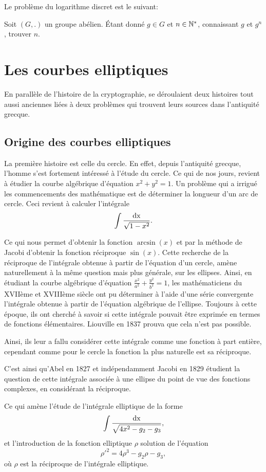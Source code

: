 Le problème du logarithme discret est le suivant: 

Soit $(G,.)$ un groupe abélien. Étant donné $g \in G$ et $n \in \mathbb{N}^*$, connaissant $g$ et
$g^{n}$, trouver $n$.

\section{Les courbes elliptiques}

En parallèle de l'histoire de la cryptographie, se déroulaient deux histoires tout aussi
anciennes liées à deux problèmes qui trouvent leurs sources dans l'antiquité grecque.

\subsection{Origine des courbes elliptiques}
La première histoire est celle du cercle. En effet, depuis l'antiquité grecque, l'homme
s'est fortement intéressé à l'étude du cercle. Ce qui de nos jours, revient à étudier la courbe
algébrique d'équation $x^2 + y^2 = 1$. Un problème qui a irrigué les commencements des
mathématique est de déterminer la longueur d'un arc de cercle. Ceci revient à calculer
l'intégrale
\[
\int \frac{\operatorname{dx}}{\sqrt{1-x^2} }
.\] 

Ce qui nous permet d'obtenir la fonction $\arcsin(x)$ et par la méthode de Jacobi d'obtenir la
fonction réciproque $\sin(x)$. Cette recherche de la réciproque de l'intégrale obtenue
à partir de l'équation d'un cercle, amène naturellement à la même question mais plus générale,
sur les ellipses. Ainsi, en étudiant la courbe algébrique d'équation $ \frac{x^2}{a^2} +
\frac{y^2}{b^2} = 1$, les mathématiciens du XVIIème et XVIIIème siècle ont pu déterminer
à l'aide d'une série convergente l'intégrale obtenue à partir de l'équation algébrique de
l'ellipse. Toujours à cette époque, ils ont cherché à savoir si cette intégrale pouvait être
exprimée en termes de fonctions élémentaires. Liouville en 1837 prouva que cela n'est pas
possible.

Ainsi, ils leur a fallu considérer cette intégrale comme une fonction à part entière,
cependant comme pour le cercle la fonction la plus naturelle est sa réciproque. 

C'est ainsi qu'Abel en 1827 et indépendamment Jacobi en 1829 étudient la question de cette
intégrale associée à une ellipse du point de vue des fonctions complexes, en considérant la
réciproque. 

Ce qui amène l'étude de l'intégrale elliptique de la forme
\[
\int \frac{\operatorname{dx}}{\sqrt{4x^2-g_2-g_3} }
,\] 
et l'introduction de la fonction elliptique $\rho$ solution de l'équation
\[
\rho'^2 = 4 \rho^3 - g_2 \rho - g_3
,\] 
où $\rho$ est la réciproque de l'intégrale elliptique.

